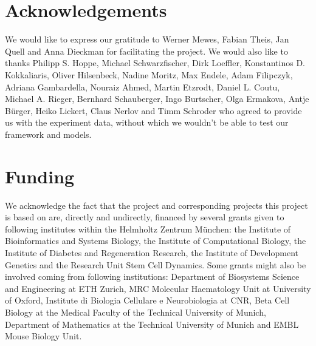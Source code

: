 \documentclass{bioinfo}
\begin{document}


\section*{Acknowledgements}

We would like to express our gratitude to Werner Mewes, Fabian Theis, Jan Quell and Anna Dieckman for facilitating the project. We would also like to thanks Philipp S. Hoppe, Michael Schwarzfischer, Dirk Loeffler, Konstantinos D. Kokkaliaris, Oliver Hilsenbeck, Nadine Moritz, Max Endele, Adam Filipczyk, Adriana Gambardella, Nouraiz Ahmed, Martin Etzrodt, Daniel L. Coutu, Michael A. Rieger, Bernhard Schauberger, Ingo Burtscher, Olga Ermakova, Antje B\"urger, Heiko Lickert, Claus Nerlov and Timm Schroder who agreed to provide us with the experiment data, without which we wouldn't be able to test our framework and models.

\vspace*{-12pt}

\section*{Funding}

We acknowledge the fact that the project and corresponding projects this project is based on are, directly and undirectly, financed by several grants given to following institutes within the Helmholtz Zentrum M\"unchen: the Institute of Bioinformatics and Systems Biology, the Institute of Computational Biology, the Institute of Diabetes and Regeneration Research, the Institute of Development Genetics and the Research Unit Stem Cell Dynamics. Some grants might also be involved coming from following institutions: Department of Biosystems Science and Engineering at ETH Zurich, MRC Molecular Haematology Unit at University of Oxford, Institute di Biologia Cellulare e Neurobiologia at CNR, Beta Cell Biology at the Medical Faculty of the Technical University of Munich, Department of Mathematics at the Technical University of Munich and EMBL Mouse Biology Unit.\vspace*{-12pt}

%
%
%
%
%
%
%
%
%
\end{document}
